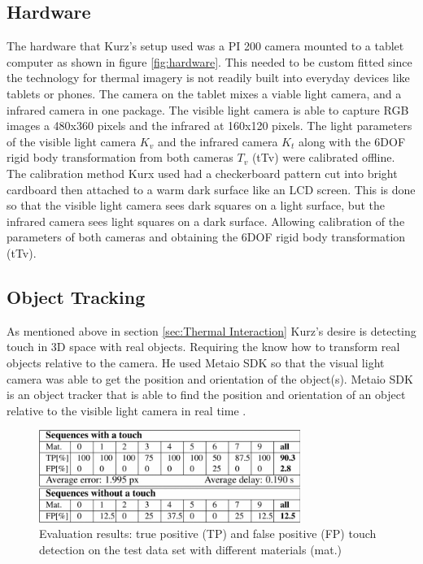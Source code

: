 \documentclass{sig-alternate}
\begin{document}
\subsection{Hardware}
\label{Hardware}

The hardware that Kurz's \cite{Thermal} setup used was a PI 200 camera mounted to a tablet computer as shown in figure \ref{fig:hardware}. This needed to be custom fitted since the technology for thermal imagery is not readily built into everyday devices like tablets or phones. The camera on the tablet mixes a viable light camera, and a infrared camera in one package. The visible light camera is able to capture RGB images a 480x360 pixels and the infrared at 160x120 pixels. The light parameters of the visible light camera \(K_v\) and the infrared camera \(K_t\) along with the 6DOF rigid body transformation from both cameras \(T_v\) (tTv) were calibrated offline. The calibration method Kurx used had a checkerboard pattern cut into bright cardboard then attached to a warm dark surface like an LCD screen. This is done so that the visible light camera sees dark squares on a light surface, but the infrared camera sees light squares on a dark surface. Allowing calibration of the parameters of both cameras and obtaining the 6DOF rigid body transformation (tTv).



\subsection{Object Tracking}
\label{Object Tracking}

As mentioned above in section \ref{sec:Thermal Interaction}  Kurz's desire is detecting touch in 3D space with real objects. Requiring the know how to transform real objects relative to the camera. He used Metaio SDK so that the visual light camera was able to get the position and orientation of the object(s). Metaio SDK is an object tracker that is able to find the position and orientation of an object relative to the visible light camera in real time \cite{Thermal}.  



\begin{figure}
	\includegraphics[width=8.5cm, height=3cm]{TouchData}
	\caption{Evaluation results: true positive (TP) and false positive (FP) touch detection on the test data set with different materials (mat.) \cite{Thermal}}
	\label{fig:TouchData}
\end{figure}
\end{document}
